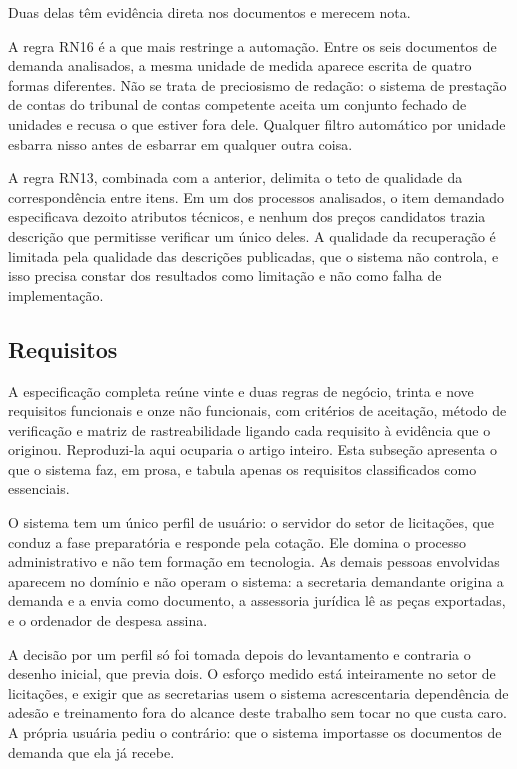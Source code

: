 Duas delas têm evidência direta nos documentos e merecem nota.

A regra RN16 é a que mais restringe a automação. Entre os seis documentos de
demanda analisados, a mesma unidade de medida aparece escrita de quatro formas
diferentes. Não se trata de preciosismo de redação: o sistema de prestação de
contas do tribunal de contas competente aceita um conjunto fechado de unidades e
recusa o que estiver fora dele. Qualquer filtro automático por unidade esbarra
nisso antes de esbarrar em qualquer outra coisa.

A regra RN13, combinada com a anterior, delimita o teto de qualidade da
correspondência entre itens. Em um dos processos analisados, o item demandado
especificava dezoito atributos técnicos, e nenhum dos preços candidatos trazia
descrição que permitisse verificar um único deles. A qualidade da recuperação é
limitada pela qualidade das descrições publicadas, que o sistema não controla, e
isso precisa constar dos resultados como limitação e não como falha de
implementação.

\subsection{Requisitos}
\label{subsec:requisitos}

A especificação completa reúne vinte e duas regras de negócio, trinta e nove
requisitos funcionais e onze não funcionais, com critérios de aceitação, método
de verificação e matriz de rastreabilidade ligando cada requisito à evidência que
o originou. Reproduzi-la aqui ocuparia o artigo inteiro. Esta subseção apresenta
o que o sistema faz, em prosa, e tabula apenas os requisitos classificados como
essenciais.

O sistema tem um único perfil de usuário: o servidor do setor de licitações, que
conduz a fase preparatória e responde pela cotação. Ele domina o processo
administrativo e não tem formação em tecnologia. As demais pessoas envolvidas
aparecem no domínio e não operam o sistema: a secretaria demandante origina a
demanda e a envia como documento, a assessoria jurídica lê as peças exportadas, e
o ordenador de despesa assina.

A decisão por um perfil só foi tomada depois do levantamento e contraria o
desenho inicial, que previa dois. O esforço medido está inteiramente no setor de
licitações, e exigir que as secretarias usem o sistema acrescentaria dependência
de adesão e treinamento fora do alcance deste trabalho sem tocar no que custa
caro. A própria usuária pediu o contrário: que o sistema importasse os documentos
de demanda que ela já recebe.

